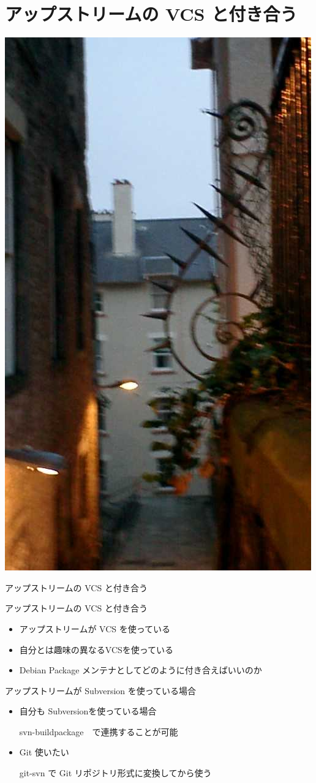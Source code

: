 \documentclass[cjk,dvipdfmx,12pt]{beamer}
\newcommand{\emtext}[1]{
\begin{frame}{}
 
\begin{minipage}{0.55\hsize}
\includegraphics[width=1\hsize]{image200707/gurutitle.jpg}
\end{minipage}
\begin{minipage}{0.39\hsize}
 {\Huge #1
 }
\end{minipage}
\end{frame}
}
\begin{document}
\section{アップストリームの VCS と付き合う}
\emtext{アップストリームの VCS と付き合う}

\begin{frame}[containsverbatim]{アップストリームの VCS と付き合う}

\begin{itemize}
\item アップストリームが VCS を使っている
\item 自分とは趣味の異なるVCSを使っている
\item Debian Package メンテナとしてどのように付き合えばいいのか
\end{itemize}
\end{frame}


\begin{frame}[containsverbatim]{アップストリームが Subversion を使っている場合}

\begin{itemize}
\item 自分も Subversionを使っている場合

svn-buildpackage　で連携することが可能

\item Git 使いたい

git-svn で Git リポジトリ形式に変換してから使う

\end{itemize}
\end{frame}
\end{document}
